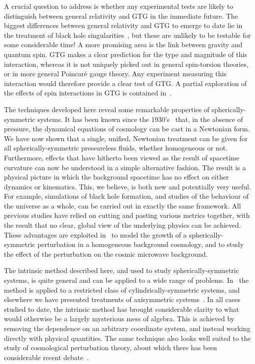 \documentclass[a4paper]{article}
\numberwithin{equation}{section}
\begin{document}
A crucial question to address is whether any experimental tests are
likely to distinguish between general relativity and GTG in the
immediate future.  The biggest differences between general relativity
and GTG to emerge to date lie in the treatment of black hole
singularities~\cite{DL04-KS,DGL96-erice}, but these are
unlikely to be testable for some considerable time!  A more promising
area is the link between gravity and quantum spin.  GTG makes a clear
prediction for the type and magnitude of this interaction, whereas it
is not uniquely picked out in general spin-torsion theories, or in
more general Poincar\'{e} gauge theory.  Any experiment measuring this
interaction would therefore provide a clear test of GTG.  A partial
exploration of the effects of spin interactions in GTG is contained
in~\cite{DGL98-spintor}.


The techniques developed here reveal some remarkable properties of
spher\-ically-symmetric systems.  It has been known since the
1930's~\cite{mil34} that, in the absence of pressure, the dynamical
equations of cosmology can be cast in a Newtonian form.  We have now
shown that a single, unified, Newtonian treatment can be given for all
spherically-symmetric pressureless fluids, whether homogeneous or not.
Furthermore, effects that have hitherto been viewed as the result of
spacetime curvature can now be understood in a simple alternative
fashion.  The result is a physical picture in which the background
spacetime has no effect on either dynamics or kinematics.  This, we
believe, is both new and potentially very useful.  For example,
simulations of black hole formation, and studies of the behaviour of
the universe as a whole, can be carried out in exactly the same
framework.  All previous studies have relied on cutting and pasting
various metrics together, with the result that no clear, global view
of the underlying physics can be achieved.  These advantages are
exploited in~\cite{DDGHL-I} to model the growth of a
spherically-symmetric perturbation in a homogeneous background
cosmology, and to study the effect of the perturbation on the cosmic
microwave background.


The intrinsic method described here, and used to study
spherically-symmet\-ric systems, is quite general and can be applied
to a wide range of problems.  In~\cite{DGL96-cylin} the method is
applied to a restricted class of cylindrically-symmetric systems, and
elsewhere we have presented treatments of axisymmetric
systems~\cite{DLkerr03,gap}.  In all cases studied to date, the
intrinsic method has brought considerable clarity to what would
otherwise be a largely mysterious mess of algebra.  This is achieved
by removing the dependence on an arbitrary coordinate system, and
instead working directly with physical quantities.  The same technique
also looks well suited to the study of cosmological perturbation
theory, about which there has been considerable recent
debate~\cite{ellis-erice94}.
\end{document}
